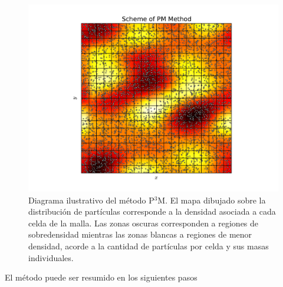 \begin{figure}[htbp]
	\centering
	\includegraphics[width=1.00\textwidth]
	{./figures/3_nbody_simulations/PM_Method.pdf}

	\caption{\small{Diagrama ilustrativo del método P$^3$M. El mapa 
	dibujado sobre la distribución de partículas corresponde a la densidad
	asociada a cada celda de la malla. Las zonas oscuras corresponden a 
	regiones de sobredensidad mientras las zonas blancas a regiones de 
	menor densidad, acorde a la cantidad de partículas por celda y sus 
	masas individuales.}}
	
	\label{fig:MP_Method}
\end{figure}

\newpage
El método puede ser resumido en los siguientes pasos


